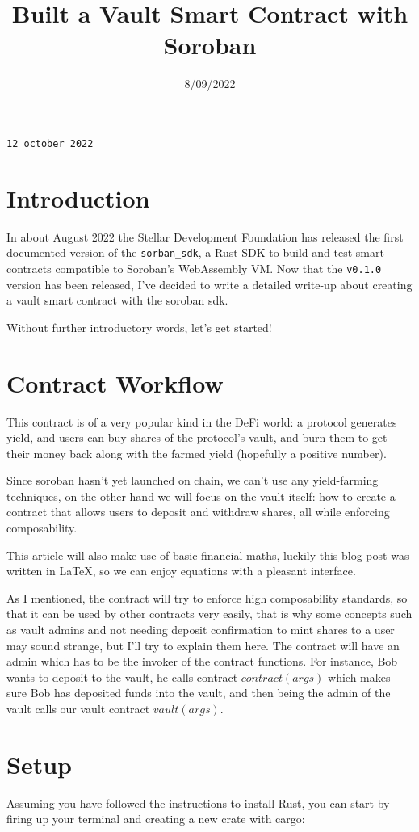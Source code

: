\documentclass{article}
\title{Built a Vault Smart Contract with Soroban}
\date{8/09/2022}
\newcommand{\inl}[1]{\lstinline{#1}}
\begin{document}
\maketitle

\texttt{12 october 2022}

\section{Introduction}
In about August 2022 the Stellar Development Foundation has released the first documented version of the \inl{sorban_sdk}, a Rust SDK to build and test smart contracts compatible to Soroban's WebAssembly VM. Now that the \inl{v0.1.0} version has been released, I've decided to write a detailed write-up about creating a vault smart contract with the soroban sdk.

Without further introductory words, let's get started!

\section{Contract Workflow}
This contract is of a very popular kind in the DeFi world: a protocol generates yield, and users can buy shares of the protocol's vault, and burn them to get their money back along with the farmed yield (hopefully a positive number).

Since soroban hasn't yet launched on chain, we can't use any yield-farming techniques, on the other hand we will focus on the vault itself: how to create a contract that allows users to deposit and withdraw shares, all while enforcing composability.

This article will also make use of basic financial maths, luckily this blog post was written in \LaTeX, so we can enjoy equations with a pleasant interface.

As I mentioned, the contract will try to enforce high composability standards, so that it can be used by other contracts very easily, that is why some concepts such as vault admins and not needing deposit confirmation to mint shares to a user may sound strange, but I'll try to explain them here. The contract will have an admin which has to be the invoker of the contract functions. For instance, Bob wants to deposit to the vault, he calls contract \( contract (args) \) which makes sure Bob has deposited funds into the vault, and then being the admin of the vault calls our vault contract \( vault (args) \).

\section{Setup}
Assuming you have followed the instructions to \href{https://www.rust-lang.org/tools/install}{install Rust}, you can start by firing up your terminal and creating a new crate with cargo:
\end{document}
